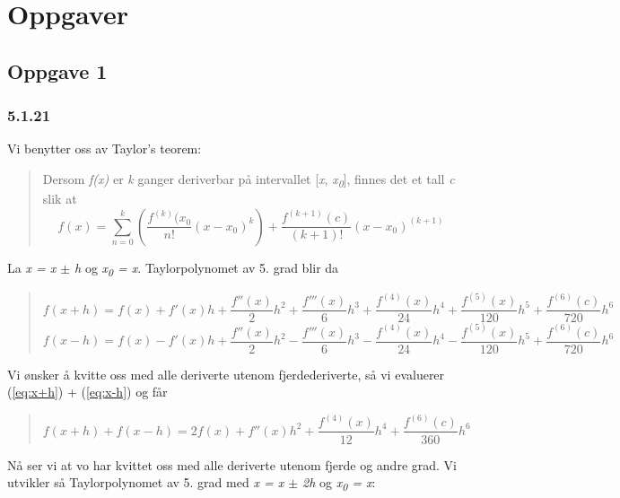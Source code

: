 \section{Oppgaver}
\subsection{Oppgave 1}\label{sec:oppg1}
\subsubsection{5.1.21}
Vi benytter oss av Taylor's teorem:
\begin{quote}
Dersom \textit{f(x)} er \textit{k} ganger deriverbar på intervallet [\textit{x}, \textit{x\textsubscript{0}}], finnes det et tall \textit{c} slik at
\begin{equation} \label{eq:taylor}
f(x) = \sum_{n=0}^k	(\frac{f^{(k)}(x_{0}}{n!} (x-x_{0})^{k}) + \frac{f^{(k+1)}(c)}{(k+1)!}(x-x_{0})^{(k+1)}
\end{equation}
\end{quote}

La \textit{x = x $\pm$ h} og \textit{x\textsubscript{0} = x}. Taylorpolynomet av 5. grad blir da
\begin{quote}
\begin{equation} \label{eq:x+h}
f(x+h) = f(x) + f'(x)h + \frac{f''(x)}{2}h^2 + \frac{f'''(x)}{6}h^3 + \frac{f^{(4)}(x)}{24}h^4 + \frac{f^{(5)}(x)}{120}h^5 + \frac{f^{(6)}(c)}{720}h^6
\end{equation}
\begin{equation} \label{eq:x-h}
f(x-h) = f(x) - f'(x)h + \frac{f''(x)}{2}h^2 - \frac{f'''(x)}{6}h^3 - \frac{f^{(4)}(x)}{24}h^4 - \frac{f^{(5)}(x)}{120}h^5 + \frac{f^{(6)}(c)}{720}h^6
\end{equation}
\end{quote}

Vi ønsker å kvitte oss med alle deriverte utenom fjerdederiverte, så vi evaluerer (\ref{eq:x+h}) + (\ref{eq:x-h}) og får
\begin{quote}
\begin{equation} \label{eq:x+-h-sum}
f(x+h)+f(x-h) = 2f(x) + f''(x)h^2 + \frac{f^{(4)}(x)}{12}h^4 + \frac{f^{(6)}(c)}{360}h^6
\end{equation}
\end{quote}

Nå ser vi at vo har kvittet oss med alle deriverte utenom fjerde og andre grad. Vi utvikler så Taylorpolynomet av 5. grad med \textit{x = x $\pm$ 2h} og \textit{x\textsubscript{0} = x}:

